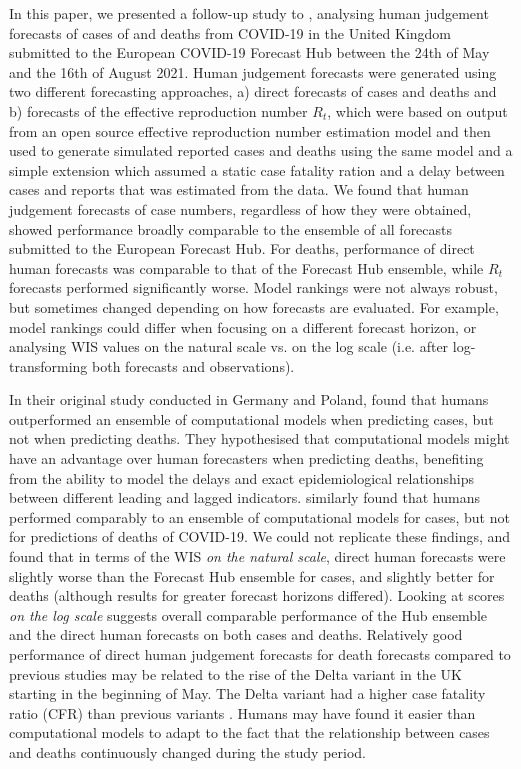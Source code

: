 \documentclass[10pt,a4paper,twocolumn]{article}
\begin{document}
In this paper, we presented a follow-up study to \cite{bosseComparingHumanModelbased2022}, analysing human judgement forecasts of cases of and deaths from COVID-19 in the United Kingdom submitted to the European COVID-19 Forecast Hub between the 24th of May and the 16th of August 2021. Human judgement forecasts were generated using two different forecasting approaches, a) direct forecasts of cases and deaths and b) forecasts of the effective reproduction number $R_t$, which were based on output from an open source effective reproduction number estimation model and then used to generate simulated reported cases and deaths using the same model and a simple extension which assumed a static case fatality ration and a delay between cases and reports that was estimated from the data. We found that human judgement forecasts of case numbers, regardless of how they were obtained, showed performance broadly comparable to the ensemble of all forecasts submitted to the European Forecast Hub. For deaths, performance of direct human forecasts was comparable to that of the Forecast Hub ensemble, while $R_t$ forecasts performed significantly worse. Model rankings were not always robust, but sometimes changed depending on how forecasts are evaluated. For example, model rankings could differ when focusing on a different forecast horizon, or analysing WIS values on the natural scale vs. on the log scale (i.e. after log-transforming both forecasts and observations). 


In their original study conducted in Germany and Poland, \citet{bosseComparingHumanModelbased2022} found that humans outperformed an ensemble of computational models when predicting cases, but not when predicting deaths. They hypothesised that computational models might have an advantage over human forecasters when predicting deaths, benefiting from the ability to model the delays and exact epidemiological relationships between different leading and lagged indicators. \citet{mcandrewChimericForecastingCombining2022} similarly found that humans performed comparably to an ensemble of computational models for cases, but not for predictions of deaths of COVID-19. We could not replicate these findings, and found that in terms of the WIS \textit{on the natural scale}, direct human forecasts were slightly worse than the Forecast Hub ensemble for cases, and slightly better for deaths (although results for greater forecast horizons differed). Looking at scores \textit{on the log scale} suggests overall comparable performance of the Hub ensemble and the direct human forecasts on both cases and deaths. Relatively good performance of direct human judgement forecasts for death forecasts compared to previous studies may be related to the rise of the Delta variant in the UK starting in the beginning of May. The Delta variant had a higher case fatality ratio (CFR) than previous variants \cite{linDiseaseSeverityClinical2021}. Humans may have found it easier than computational models to adapt to the fact that the relationship between cases and deaths continuously changed during the study period. 
\end{document}
